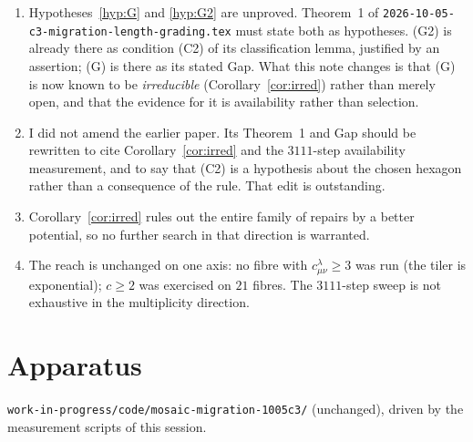 \documentclass[11pt]{article}
\theoremstyle{plain}
\theoremstyle{definition}
\begin{document}
\begin{enumerate}
\item Hypotheses~\ref{hyp:G} and \ref{hyp:G2} are unproved.  Theorem~1 of
  \texttt{2026-10-05-c3-migration-length-grading.tex} must state both as
  hypotheses.  (G2) is already there as condition (C2) of its classification
  lemma, justified by an assertion; (G) is there as its stated Gap.  What this note
  changes is that (G) is now known to be \emph{irreducible}
  (Corollary~\ref{cor:irred}) rather than merely open, and that the evidence for it
  is availability rather than selection.
\item I did not amend the earlier paper.  Its Theorem~1 and Gap should be rewritten
  to cite Corollary~\ref{cor:irred} and the $3111$-step availability measurement,
  and to say that (C2) is a hypothesis about the chosen hexagon rather than a
  consequence of the rule.  That edit is outstanding.
\item Corollary~\ref{cor:irred} rules out the entire family of repairs by a
  better potential, so no further search in that direction is warranted.
\item The reach is unchanged on one axis: no fibre with
  $c^\lambda_{\mu\nu}\ge3$ was run (the tiler is exponential);
  $c\ge2$ was exercised on $21$ fibres.  The $3111$-step sweep is not exhaustive
  in the multiplicity direction.
\end{enumerate}

\section*{Apparatus}

\texttt{work-in-progress/code/mosaic-migration-1005c3/} (unchanged), driven by
the measurement scripts of this session.
\end{document}
